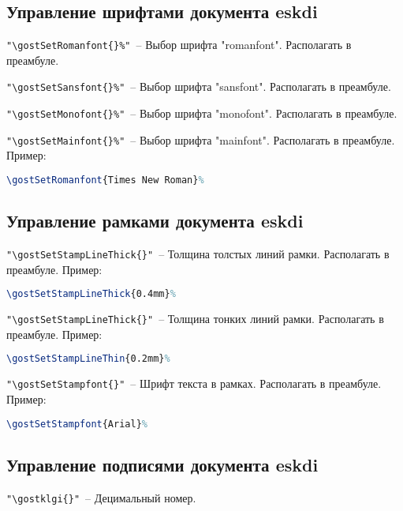 \subsection{Управление шрифтами документа eskdi}


\noindent \verb|"\gostSetRomanfont{}%"|~– Выбор шрифта "romanfont".  Располагать в преамбуле.

\noindent \verb|"\gostSetSansfont{}%"|~– Выбор шрифта "sansfont".  Располагать в преамбуле.

\noindent \verb|"\gostSetMonofont{}%"|~– Выбор шрифта "monofont".  Располагать в преамбуле.

\noindent \verb|"\gostSetMainfont{}%"|~– Выбор шрифта "mainfont".  Располагать в преамбуле.
Пример:
\begin{lstlisting}[language=TeX, style=FrameStyle]
\gostSetRomanfont{Times New Roman}%
\end{lstlisting}




\subsection{Управление рамками документа eskdi}


\noindent \verb|"\gostSetStampLineThick{}"|~– Толщина толстых линий рамки. Располагать в преамбуле. Пример:
\begin{lstlisting}[language=TeX, style=FrameStyle]
\gostSetStampLineThick{0.4mm}%
\end{lstlisting}

\noindent \verb|"\gostSetStampLineThick{}"|~– Толщина тонких линий рамки. Располагать в преамбуле. Пример:
\begin{lstlisting}[language=TeX, style=FrameStyle]
\gostSetStampLineThin{0.2mm}%
\end{lstlisting}


\noindent \verb|"\gostSetStampfont{}"|~– Шрифт текста в рамках. Располагать в преамбуле. Пример:
\begin{lstlisting}[language=TeX, style=FrameStyle]
\gostSetStampfont{Arial}%
\end{lstlisting}





\subsection{Управление подписями документа eskdi}

\noindent \verb|"\gostklgi{}"|~– Децимальный номер.

